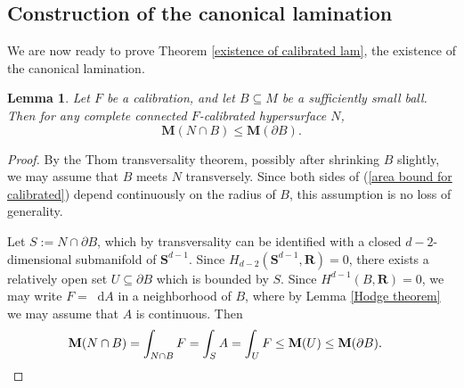 \documentclass[reqno,11pt]{amsart}
\newcommand{\RR}{\mathbf{R}}
\newcommand{\Sph}{\mathbf S}
\newcommand*\dif{\mathop{}\!\mathrm{d}}
\newcommand{\Mass}{\mathbf M}
\newtheorem{lemma}[theorem]{Lemma}
\theoremstyle{definition}
\numberwithin{equation}{section}
\begin{document}
\subsection{Construction of the canonical lamination}
We are now ready to prove Theorem \ref{existence of calibrated lam}, the existence of the canonical lamination.

\begin{lemma}
Let $F$ be a calibration, and let $B \subseteq M$ be a sufficiently small ball.
Then for any complete connected $F$-calibrated hypersurface $N$, 
\begin{equation}\label{area bound for calibrated}
\Mass(N \cap B) \leq \Mass(\partial B).
\end{equation}
\end{lemma}
\begin{proof}
By the Thom transversality theorem, possibly after shrinking $B$ slightly, we may assume that $B$ meets $N$ transversely.
Since both sides of (\ref{area bound for calibrated}) depend continuously on the radius of $B$, this assumption is no loss of generality.

Let $S := N \cap \partial B$, which by transversality can be identified with a closed $d - 2$-dimensional submanifold of $\Sph^{d - 1}$.
Since $H_{d - 2}(\Sph^{d - 1}, \RR) = 0$, there exists a relatively open set $U \subseteq \partial B$ which is bounded by $S$.
Since $H^{d - 1}(B, \RR) = 0$, we may write $F = \dif A$ in a neighborhood of $B$, where by Lemma \ref{Hodge theorem} we may assume that $A$ is continuous.
Then
\begin{align*}
\Mass(N \cap B) &= \int_{N \cap B} F = \int_S A = \int_U F \leq \Mass(U) \leq \Mass(\partial B). \qedhere
\end{align*}
\end{proof}
\end{document}
